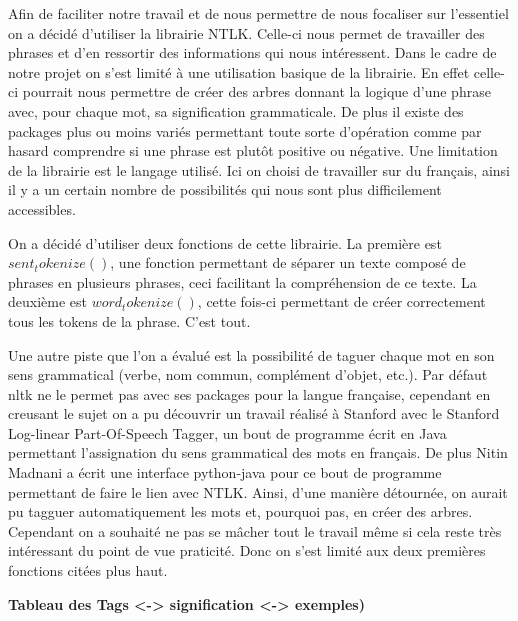 \documentclass[french,12pt]{article}
\begin{document}
\begin{enumerate}
\bigbreak
\raggedright
\setlength{\parindent}{0,5cm}


Afin de faciliter notre travail et de nous permettre de nous focaliser sur l’essentiel on a décidé d’utiliser la librairie NTLK. Celle-ci nous permet de travailler des phrases et d’en ressortir des informations qui nous intéressent.
\bigbreak
Dans le cadre de notre projet on s’est limité à une utilisation basique de la librairie. En effet celle-ci pourrait nous permettre de créer des arbres donnant la logique d’une phrase avec, pour chaque mot, sa signification grammaticale. De plus il existe des packages plus ou moins variés permettant toute sorte d’opération comme par hasard comprendre si une phrase est plutôt positive ou négative. Une limitation de la librairie est le langage utilisé. Ici on choisi de travailler sur du français, ainsi il y a un certain nombre de possibilités qui nous sont plus difficilement accessibles.
\bigbreak
\begin{sloppypar}
On a décidé d’utiliser deux fonctions de cette librairie. La première est $sent_tokenize()$, une fonction permettant de séparer un texte composé de phrases en plusieurs phrases, ceci facilitant la compréhension de ce texte. La deuxième est $word_tokenize()$, cette fois-ci permettant de créer correctement tous les tokens de la phrase. C’est tout.
\end{sloppypar}
\bigbreak
\begin{sloppypar}
Une autre piste que l’on a évalué est la possibilité de taguer chaque mot en son sens grammatical (verbe, nom commun, complément d’objet, etc.). Par défaut nltk ne le permet pas avec ses packages pour la langue française, cependant en creusant le sujet on a pu découvrir un travail réalisé à Stanford avec le Stanford Log-linear Part-Of-Speech Tagger, un bout de programme écrit en Java permettant l’assignation du sens grammatical des mots en français. De plus Nitin Madnani a écrit une interface python-java pour ce bout de programme permettant de faire le lien avec NTLK. Ainsi, d’une manière détournée, on aurait pu tagguer automatiquement les mots et, pourquoi pas, en créer des arbres. Cependant on a souhaité ne pas se mâcher tout le travail même si cela reste très intéressant du point de vue praticité. Donc on s’est limité aux deux premières fonctions citées plus haut.

\end{sloppypar}

\bigbreak
\textbf{Tableau des Tags <-> signification <-> exemples)} \\
\begin{tabular}{|c|c|c|}


\end{tabular}
\end{enumerate}
\end{document}
